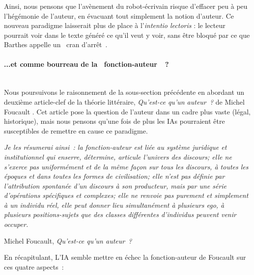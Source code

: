 \documentclass{article}
\newcommand{\subsubsubsection}[1]{\paragraph{#1}\mbox{}\\}
\newenvironment{citationbox}
{\begin{center}
		\begin{minipage}{.8\textwidth}
		}
		{
		\end{minipage}	
\end{center}
}
\begin{document}
					Ainsi, nous pensons que l'avènement du robot-écrivain risque d'effacer peu à peu l'hégémonie de l'auteur, en évacuant tout simplement la notion d'auteur. Ce nouveau paradigme laisserait plus de place à l'\textit{intentio lectoris} : le lecteur pourrait voir dans le texte généré ce qu'il veut y voir, sans être bloqué par ce que Barthes appelle un \guillemotleft~cran d'arrêt~\guillemotright.
				\subsubsubsection{...et comme bourreau de la \guillemotleft~fonction-auteur~\guillemotright~?}
					Nous poursuivons le raisonnement de la sous-section précédente en abordant un deuxième article-clef de la théorie littéraire, \textit{Qu'est-ce qu'un auteur~?} de Michel Foucault \autocite{foucault1969}. Cet article pose la question de l'auteur dans un cadre plus vaste (légal, historique), mais nous pensons qu'une fois de plus les IAs pourraient être susceptibles de remettre en cause ce paradigme.
					\begin{citationbox}
						\textit{Je les résumerai ainsi~: la fonction-auteur est liée
						au système juridique et institutionnel qui enserre, détermine, articule l'univers des discours; elle ne
						s'exerce pas uniformément et de la même façon sur tous les discours, à toutes les époques et dans
						toutes les formes de civilisation; elle n'est pas définie par l'attribution spontanée d'un discours à
						son producteur, mais par une série d'opérations spécifiques et complexes; elle ne renvoie pas purement et simplement à un individu réel, elle peut donner lieu simultanément à plusieurs ego, à
						plusieurs positions-sujets que des classes différentes d'individus peuvent venir occuper.}
					\begin{flushright}
						Michel Foucault, \textit{Qu'est-ce qu'un auteur~?} \autocite{foucault1969}
					\end{flushright}
					\end{citationbox}
					En récapitulant, L'IA semble mettre en échec la fonction-auteur de Foucault sur ces quatre aspects~:
					\vspace{2mm}
\end{document}
